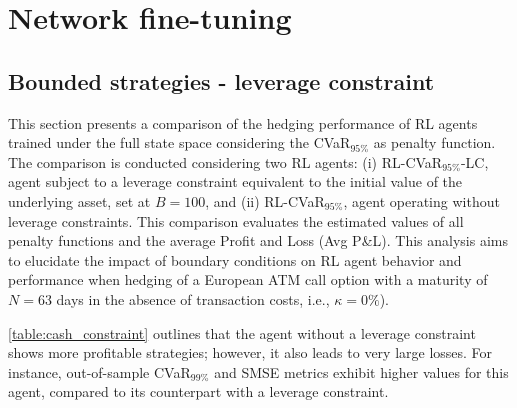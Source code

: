 

\section{Network fine-tuning}

\subsection{Bounded strategies - leverage constraint}\label{se:Bounded strategies - leverage constraint}

This section presents a comparison of the hedging performance of RL agents trained under the full state space considering the CVaR$_{95\%}$ as penalty function. The comparison is conducted considering two RL agents: (i) RL-CVaR$_{95\%}$-LC, agent subject to a leverage constraint  equivalent to the initial value of the underlying asset, set at $B=100$, and (ii) RL-CVaR$_{95\%}$, agent operating without leverage constraints. This comparison evaluates the estimated values of all penalty functions and the average Profit and Loss (Avg P\&L). This analysis aims to elucidate the impact of boundary conditions on RL agent behavior and performance when hedging of a European ATM call option with a maturity of $N=63$ days in the absence of transaction costs, i.e., $\kappa = 0\%$).

\autoref{table:cash_constraint} outlines that the agent without a leverage constraint shows more profitable strategies; however, it also leads to very large losses. For instance, out-of-sample CVaR$_{99\%}$ and SMSE metrics exhibit higher values for this agent, compared to its counterpart with a leverage constraint. 

